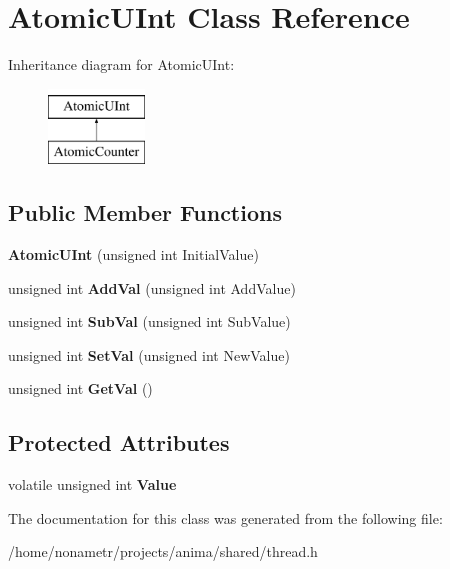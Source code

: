 \hypertarget{classAtomicUInt}{
\section{AtomicUInt Class Reference}
\label{classAtomicUInt}
}
Inheritance diagram for AtomicUInt:\begin{figure}[H]
\begin{center}
\leavevmode
\includegraphics[height=2.000000cm]{classAtomicUInt}
\end{center}
\end{figure}
\subsection*{Public Member Functions}
\begin{DoxyCompactItemize}
\item 
\hypertarget{classAtomicUInt_a65bd3ad3493bd2f2797db73aacce9882}{
{\bfseries AtomicUInt} (unsigned int InitialValue)}
\label{classAtomicUInt_a65bd3ad3493bd2f2797db73aacce9882}

\item 
\hypertarget{classAtomicUInt_aa16cf15f22172632f9673107fd64125f}{
unsigned int {\bfseries AddVal} (unsigned int AddValue)}
\label{classAtomicUInt_aa16cf15f22172632f9673107fd64125f}

\item 
\hypertarget{classAtomicUInt_a8cad39024abf87ec35e9a0b3c01a1b4f}{
unsigned int {\bfseries SubVal} (unsigned int SubValue)}
\label{classAtomicUInt_a8cad39024abf87ec35e9a0b3c01a1b4f}

\item 
\hypertarget{classAtomicUInt_ab2be7335f1e46788bb0a248c5d70b5e8}{
unsigned int {\bfseries SetVal} (unsigned int NewValue)}
\label{classAtomicUInt_ab2be7335f1e46788bb0a248c5d70b5e8}

\item 
\hypertarget{classAtomicUInt_a6178d82e56e409e9feeb3caa5c9f741d}{
unsigned int {\bfseries GetVal} ()}
\label{classAtomicUInt_a6178d82e56e409e9feeb3caa5c9f741d}

\end{DoxyCompactItemize}
\subsection*{Protected Attributes}
\begin{DoxyCompactItemize}
\item 
\hypertarget{classAtomicUInt_aba7c56a82dffafaa622adfe4ec09d2ca}{
volatile unsigned int {\bfseries Value}}
\label{classAtomicUInt_aba7c56a82dffafaa622adfe4ec09d2ca}

\end{DoxyCompactItemize}


The documentation for this class was generated from the following file:\begin{DoxyCompactItemize}
\item 
/home/nonametr/projects/anima/shared/thread.h\end{DoxyCompactItemize}
